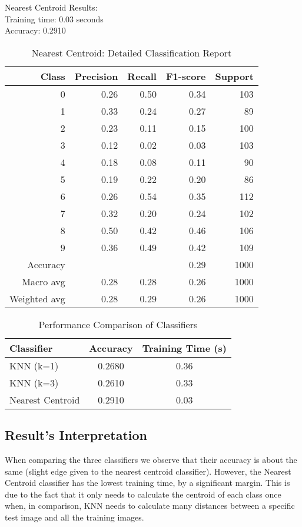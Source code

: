 Nearest Centroid Results:\\
Training time: 0.03 seconds\\
Accuracy: 0.2910
\begin{table}[H]
\centering
  \begin{tabular}{r r r r r}
    \toprule
    Class & Precision & Recall & F1-score & Support \\
    \midrule
    0 & 0.26 & 0.50 & 0.34 & 103 \\
    1 & 0.33 & 0.24 & 0.27 & 89 \\
    2 & 0.23 & 0.11 & 0.15 & 100 \\
    3 & 0.12 & 0.02 & 0.03 & 103 \\
    4 & 0.18 & 0.08 & 0.11 & 90 \\
    5 & 0.19 & 0.22 & 0.20 & 86 \\
    6 & 0.26 & 0.54 & 0.35 & 112 \\
    7 & 0.32 & 0.20 & 0.24 & 102 \\
    8 & 0.50 & 0.42 & 0.46 & 106 \\
    9 & 0.36 & 0.49 & 0.42 & 109 \\
    \midrule
    Accuracy & & & 0.29 & 1000 \\
    Macro avg & 0.28 & 0.28 & 0.26 & 1000 \\
    Weighted avg & 0.28 & 0.29 & 0.26 & 1000 \\
    \bottomrule
  \end{tabular}
  \vspace{10pt}
  \caption{Nearest Centroid: Detailed Classification Report} 
\end{table}

\begin{table}[H]
  \centering
  \begin{tabular}{lcc}
    \toprule
    Classifier & Accuracy & Training Time (s) \\
    \midrule
    KNN (k=1) & 0.2680 & 0.36 \\
    KNN (k=3) & 0.2610 & 0.33 \\
    Nearest Centroid & 0.2910 & 0.03 \\
    \bottomrule
  \end{tabular}
  \vspace{10pt}
  \caption{Performance Comparison of Classifiers}
\end{table}

\subsection{Result's Interpretation}
When comparing the three classifiers we observe that their accuracy is about the same (slight edge 
given to the nearest centroid classifier). However, the Nearest Centroid classifier has the lowest 
training time, by a significant margin. This is due to the fact that it only needs to calculate the 
centroid of each class once when, in comparison, KNN needs to calculate many distances between a 
specific test image and all the training images.

